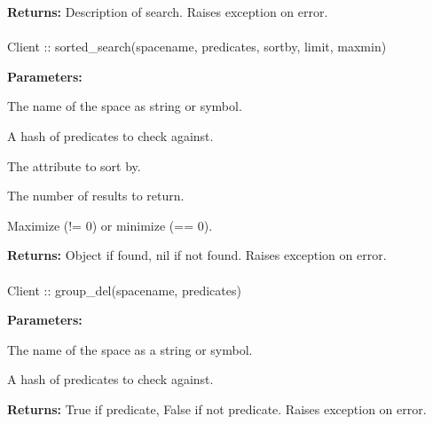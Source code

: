 \noindent\textbf{Returns:}
Description of search.  Raises exception on error.

\paragraph{}
\label{api:ruby:sorted_search}
\begin{rubycode}
Client :: sorted_search(spacename, predicates, sortby, limit, maxmin)
\end{rubycode}


\noindent\textbf{Parameters:}
\begin{description}[labelindent=\widthof{{\code{predicates}}},leftmargin=*,noitemsep,nolistsep,align=right]
\item[\code{spacename}] The name of the space as string or symbol.
\item[\code{predicates}] A hash of predicates to check against.
\item[\code{sortby}] The attribute to sort by.
\item[\code{limit}] The number of results to return.
\item[\code{maxmin}] Maximize (!= 0) or minimize (== 0).
\end{description}

\noindent\textbf{Returns:}
Object if found, nil if not found.  Raises exception on error.

\paragraph{}
\label{api:ruby:group_del}
\begin{rubycode}
Client :: group_del(spacename, predicates)
\end{rubycode}


\noindent\textbf{Parameters:}
\begin{description}[labelindent=\widthof{{\code{predicates}}},leftmargin=*,noitemsep,nolistsep,align=right]
\item[\code{spacename}] The name of the space as a string or symbol.
\item[\code{predicates}] A hash of predicates to check against.
\end{description}

\noindent\textbf{Returns:}
True if predicate, False if not predicate.  Raises exception on error.

